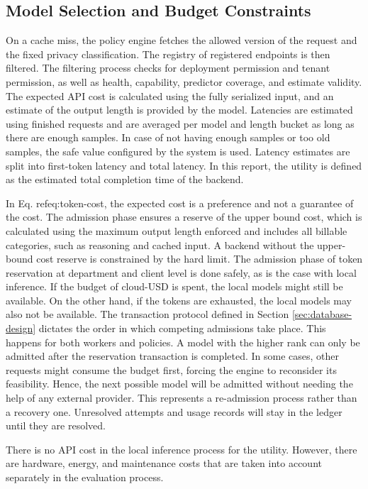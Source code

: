 \documentclass{FastFyp}
\begin{document}
\subsection{Model Selection and Budget Constraints}
On a cache miss, the policy engine fetches the allowed version of the request and the fixed privacy classification. The registry of registered endpoints is then filtered. The filtering process checks for deployment permission and tenant permission, as well as health, capability, predictor coverage, and estimate validity. The expected API cost is calculated using the fully serialized input, and an estimate of the output length is provided by the model. Latencies are estimated using finished requests and are averaged per model and length bucket as long as there are enough samples. In case of not having enough samples or too old samples, the safe value configured by the system is used. Latency estimates are split into first-token latency and total latency. In this report, the utility is defined as the estimated total completion time of the backend.

In Eq. ref{eq:token-cost}, the expected cost is a preference and not a guarantee of the cost. The admission phase ensures a reserve of the upper bound cost, which is calculated using the maximum output length enforced and includes all billable categories, such as reasoning and cached input. A backend without the upper-bound cost reserve is constrained by the hard limit. The admission phase of token reservation at department and client level is done safely, as is the case with local inference. If the budget of cloud-USD is spent, the local models might still be available. On the other hand, if the tokens are exhausted, the local models may also not be available.
The transaction protocol defined in Section \ref{sec:database-design} dictates the order in which competing admissions take place. This happens for both workers and policies. A model with the higher rank can only be admitted after the reservation transaction is completed. In some cases, other requests might consume the budget first, forcing the engine to reconsider its feasibility. Hence, the next possible model will be admitted without needing the help of any external provider. This represents a re-admission process rather than a recovery one. Unresolved attempts and usage records will stay in the ledger until they are resolved.

There is no API cost in the local inference process for the utility. However, there are hardware, energy, and maintenance costs that are taken into account separately in the evaluation process.
\end{document}
